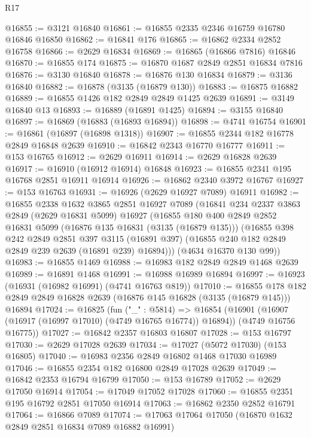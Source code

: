\begin{lexlean}{R17}
\begin{coremodule}
@16855 := @3121 @16840
@16861 := @16855 @2335 @2346 @16759 @16780 @16846 @16850
@16862 := @16841 @176
@16865 := @16862 @2334 @2852 @16758
@16866 := @2629 @16834
@16869 := @16865 (@16866 @7816) @16846
@16870 := @16855 @174
@16875 := @16870 @1687 @2849 @2851 @16834 @7816
@16876 := @3130 @16840
@16878 := @16876 @130 @16834
@16879 := @3136 @16840
@16882 := @16878 (@3135 (@16879 @130))
@16883 := @16875 @16882
@16889 := @16855 @1426 @182 @2849 @2849 @1425 @2639
@16891 := @3149 @16840 @13
@16893 := @16889 (@16891 @1425)
@16894 := @3155 @16840
@16897 := @16869 (@16883 (@16893 @16894))
@16898 := @4741 @16754
@16901 := @16861 (@16897 (@16898 @1318))
@16907 := @16855 @2344 @182 @16778 @2849 @16848 @2639
@16910 := @16842 @2343 @16770 @16777
@16911 := @153 @16765
@16912 := @2629 @16911
@16914 := @2629 @16828 @2639
@16917 := @16910 (@16912 @16914) @16848
@16923 := @16855 @2341 @195 @16768 @2851 @16911 @16914
@16926 := @16862 @2340 @3972 @16767
@16927 := @153 @16763
@16931 := @16926 (@2629 @16927 @7089) @16911
@16982 := @16855
    @2338
    @1632
    @3865
    @2851
    @16927
    @7089
    (@16841
      @234
      @2337
      @3863
      @2849
      (@2629 @16831 @5099)
      @16927
      (@16855
        @180
        @400
        @2849
        @2852
        @16831
        @5099
        (@16876 @135 @16831 (@3135 (@16879 @135)))
        (@16855
          @398
          @242
          @2849
          @2851
          @397
          @3115
          (@16891 @397)
          (@16855 @240 @182 @2849 @2849 @239 @2639 (@16891 @239) @16894)))
      (@4634 @16370 @130 @99))
@16983 := @16855 @1469
@16988 := @16983 @182 @2849 @2849 @1468 @2639
@16989 := @16891 @1468
@16991 := @16988 @16989 @16894
@16997 := @16923 (@16931 (@16982 @16991) (@4741 @16763 @819))
@17010 := @16855
    @178
    @182
    @2849
    @2849
    @16828
    @2639
    (@16876 @145 @16828 (@3135 (@16879 @145)))
    @16894
@17024 := @16825
    (fun ("_" : @5814) =>
    @16854
      (@16901 (@16907 (@16917 (@16997 @17010) (@4749 @16765 @16774)) @16894))
      (@4749 @16756 @16775))
@17027 := @16842 @2357 @16803 @16807
@17028 := @153 @16797
@17030 := @2629 @17028 @2639
@17034 := @17027 (@5072 @17030) (@153 @16805)
@17040 := @16983 @2356 @2849 @16802 @1468 @17030 @16989
@17046 := @16855 @2354 @182 @16800 @2849 @17028 @2639
@17049 := @16842 @2353 @16794 @16799
@17050 := @153 @16789
@17052 := @2629 @17050 @16914
@17054 := @17049 @17052 @17028
@17060 := @16855 @2351 @195 @16792 @2851 @17050 @16914
@17063 := @16862 @2350 @2852 @16791
@17064 := @16866 @7089
@17074 := @17063 @17064 @17050 (@16870 @1632 @2849 @2851 @16834 @7089 @16882 @16991)

\end{coremodule}
\end{lexlean}
